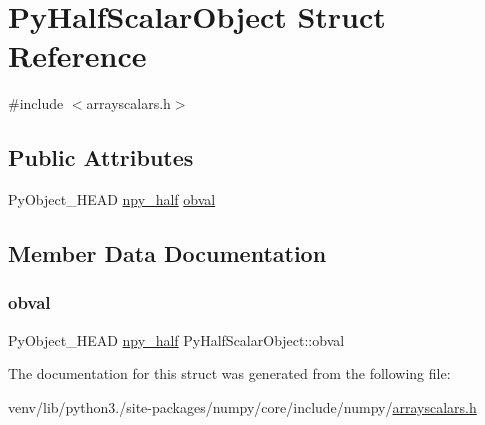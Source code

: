 \hypertarget{structPyHalfScalarObject}{}\section{Py\+Half\+Scalar\+Object Struct Reference}
\label{structPyHalfScalarObject}


{\ttfamily \#include $<$arrayscalars.\+h$>$}

\subsection*{Public Attributes}
\begin{DoxyCompactItemize}
\item 
Py\+Object\+\_\+\+H\+E\+AD \hyperlink{npy__common_8h_a8e9ae8f3f82735dc5fd266e614ab2d0b}{npy\+\_\+half} \hyperlink{structPyHalfScalarObject_a5841dce6e3b8e487e79805423e06a620}{obval}
\end{DoxyCompactItemize}


\subsection{Member Data Documentation}
\mbox{\label{structPyHalfScalarObject_a5841dce6e3b8e487e79805423e06a620}} 
\subsubsection{\texorpdfstring{obval}{obval}}
{\footnotesize\ttfamily Py\+Object\+\_\+\+H\+E\+AD \hyperlink{npy__common_8h_a8e9ae8f3f82735dc5fd266e614ab2d0b}{npy\+\_\+half} Py\+Half\+Scalar\+Object\+::obval}



The documentation for this struct was generated from the following file\+:\begin{DoxyCompactItemize}
\item 
venv/lib/python3./site-\/packages/numpy/core/include/numpy/\hyperlink{arrayscalars_8h}{arrayscalars.\+h}\end{DoxyCompactItemize}

